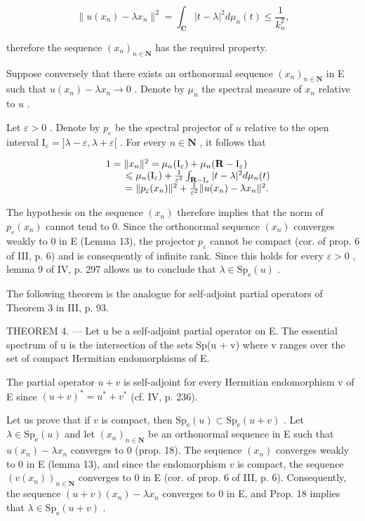 \[
\| u (x _ {n}) - \lambda x _ {n} \| ^ {2} = \int_ {\mathbf {C}} | t - \lambda | ^ {2} d \mu_ {n} (t) \leqslant \frac {1}{k _ {n} ^ {2}},
\]

therefore the sequence \((x_{n})_{n\in\mathbf{N}}\) has the required property.

Suppose conversely that there exists an orthonormal sequence \((x_{n})_{n\in \mathbf{N}}\) in E such that \(u(x_{n}) - \lambda x_{n}\to 0\) . Denote by \(\mu_{n}\) the spectral measure of \(x_{n}\) relative to \(u\) .

Let \(\varepsilon > 0\) . Denote by \(p_{\varepsilon}\) be the spectral projector of \(u\) relative to the open interval \(\mathrm{I}_{\varepsilon} = ]\lambda - \varepsilon, \lambda + \varepsilon[\) . For every \(n \in \mathbf{N}\) , it follows that

\[
\begin{array}{r l} & 1 = \| x _ {n} \| ^ {2} = \mu_ {n} (\mathrm{I} _ {\varepsilon}) + \mu_ {n} (\mathbf {R} - \mathrm{I} _ {\varepsilon}) \\ & \qquad \leqslant \mu_ {n} (\mathrm{I} _ {\varepsilon}) + \frac {1}{\varepsilon^ {2}} \int_ {\mathbf {R} - \mathrm{I} _ {\varepsilon}} | t - \lambda | ^ {2} d \mu_ {n} (t) \\ & \qquad = \| p _ {\varepsilon} (x _ {n}) \| ^ {2} + \frac {1}{\varepsilon^ {2}} \| u (x _ {n}) - \lambda x _ {n} \| ^ {2}. \end{array}
\]

The hypothesis on the sequence \((x_{n})\) therefore implies that the norm of \(p_{\varepsilon}(x_{n})\) cannot tend to 0. Since the orthonormal sequence \((x_{n})\) converges weakly to 0 in E (Lemma 13), the projector \(p_{\varepsilon}\) cannot be compact (cor. of prop. 6 of III, p. 6) and is consequently of infinite rank. Since this holds for every \(\varepsilon > 0\) , lemma 9 of IV, p. 297 allows us to conclude that \(\lambda \in \mathrm{Sp}_{\mathrm{e}}(u)\) .

The following theorem is the analogue for self-adjoint partial operators of Theorem 3 in III, p. 93.

THEOREM 4. --- Let u be a self-adjoint partial operator on E. The essential spectrum of u is the intersection of the sets Sp(u + v) where v ranges over the set of compact Hermitian endomorphisms of E.

The partial operator \(u + v\) is self-adjoint for every Hermitian endomorphism v of E since \((u + v)^{*} = u^{*} + v^{*}\) (cf. IV, p. 236).

Let us prove that if \(v\) is compact, then \(\mathrm{Sp_e}(u) \subset \mathrm{Sp_e}(u + v)\) . Let \(\lambda \in \mathrm{Sp_e}(u)\) and let \((x_n)_{n \in \mathbf{N}}\) be an orthonormal sequence in E such that \(u(x_n) - \lambda x_n\) converges to 0 (prop. 18). The sequence \((x_n)\) converges weakly to 0 in E (lemma 13), and since the endomorphism \(v\) is compact, the sequence \((v(x_n))_{n \in \mathbf{N}}\) converges to 0 in E (cor. of prop. 6 of III, p. 6). Consequently, the sequence \((u+v)(x_{n})-\lambda x_{n}\) converges to 0 in E, and Prop. 18 implies that \(\lambda\in\mathrm{Sp}_{\mathrm{e}}(u+v)\) .


